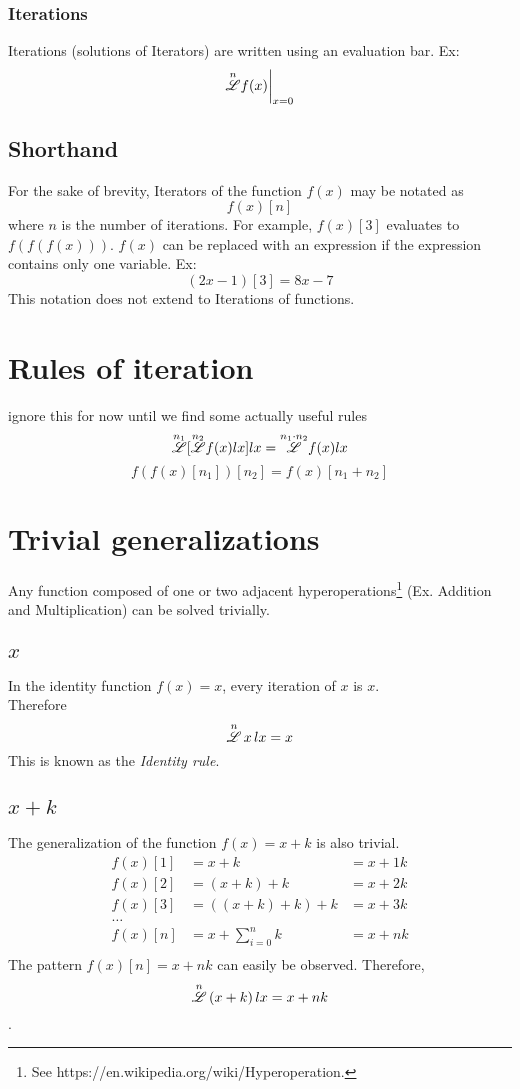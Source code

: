 \documentclass[12pt, letterpaper]{article}
\begin{document}
\subsubsection{Iterations}
Iterations (solutions of Iterators) are written using an evaluation bar. Ex:
$$\overset{n}{\mathscr{L}}f(x)\bigg|_{x=0}$$

\subsection{Shorthand}
For the sake of brevity, Iterators of the function $f(x)$ may be notated as
$$f(x)[n]$$ 
where $n$ is the number of iterations. For example, $f(x)[3]$ evaluates to $f(f(f(x)))$. $f(x)$ can be replaced with an expression if the expression contains only one variable. Ex:
$$(2x-1)[3] = 8x-7$$
This notation does not extend to Iterations of functions.

\section{Rules of iteration}
ignore this for now until we find some actually useful rules
$$\overset{n_1}{\mathscr{L}}[\overset{n_2}{\mathscr{L}} f(x) lx] lx = \overset{n_1\cdot n_2}{\mathscr{L}} f(x) lx$$
$$f(f(x)[n_1])[n_2] = f(x)[n_1+n_2]$$

\section{Trivial generalizations}
Any function composed of one or two adjacent hyperoperations\footnote{See https://en.wikipedia.org/wiki/Hyperoperation.} (Ex. Addition and Multiplication) can be solved trivially.

\subsection{$x$}
In the identity function \(f(x) = x\), every iteration of \(x\) is \(x\). 
\\
Therefore
$$\overset{n}{\mathscr{L}} \, x \, lx = x$$
This is known as the \textit{Identity rule}.

\subsection{$x+k$}
The generalization of the function $f(x) = x+k$ is also trivial.
\begin{align*}
    f(x)[1] &= x + k             &= x + 1k \\
    f(x)[2] &= (x + k) + k       &= x + 2k \\
    f(x)[3] &= ((x + k) + k) + k &= x + 3k \\
       \dots \\
    f(x)[n] &= x + \sum_{i=0}^n k  &= x + nk \\
\end{align*}
The pattern $f(x)[n] = x + nk$ can easily be observed. Therefore,
$$\overset{n}{\mathscr{L}} \, (x+k) \, lx = x+nk$$.
\\
\end{document}
